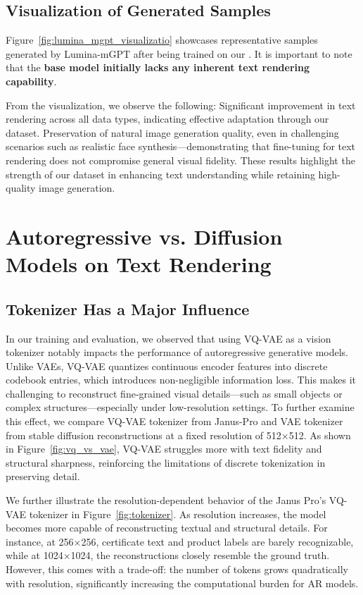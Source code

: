 \subsection{Visualization of Generated Samples}

Figure~\ref{fig:lumina_mgpt_visualizatio} showcases representative samples generated by Lumina-mGPT after being trained on our \DatasetName. 
It is important to note that the \textbf{base model initially lacks any inherent text rendering capability}.

From the visualization, we observe the following:
Significant improvement in text rendering across all data types, indicating effective adaptation through our dataset.
Preservation of natural image generation quality, even in challenging scenarios such as realistic face synthesis—demonstrating that fine-tuning for text rendering does not compromise general visual fidelity.
These results highlight the strength of our dataset in enhancing text understanding while retaining high-quality image generation.




\section{Autoregressive vs. Diffusion Models on Text Rendering}


\subsection{Tokenizer Has a Major Influence}

In our training and evaluation, we observed that using VQ-VAE as a vision tokenizer notably impacts the performance of autoregressive generative models. Unlike VAEs, VQ-VAE quantizes continuous encoder features into discrete codebook entries, which introduces non-negligible information loss. This makes it challenging to reconstruct fine-grained visual details—such as small objects or complex structures—especially under low-resolution settings. To further examine this effect, we compare VQ-VAE tokenizer from Janus-Pro \cite{januspro} and VAE tokenizer from stable diffusion 
\cite{sd3} reconstructions at a fixed resolution of 512×512. As shown in Figure~\ref{fig:vq_vs_vae}, VQ-VAE struggles more with text fidelity and structural sharpness, reinforcing the limitations of discrete tokenization in preserving detail.

We further illustrate the resolution-dependent behavior of the Janus Pro's VQ-VAE tokenizer in Figure~\ref{fig:tokenizer}. As resolution increases, the model becomes more capable of reconstructing textual and structural details. For instance, at 256×256, certificate text and product labels are barely recognizable, while at 1024×1024, the reconstructions closely resemble the ground truth. However, this comes with a trade-off: the number of tokens grows quadratically with resolution, significantly increasing the computational burden for AR models. 

